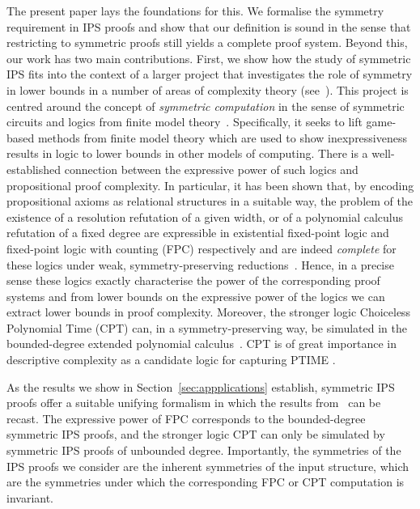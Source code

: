 \documentclass[a4paper,UKenglish,cleveref, autoref, thm-restate]{lipics-v2021}
\begin{document}
	The present paper lays the foundations for this. We formalise the symmetry requirement in IPS proofs and show that our definition is sound in the sense that restricting to symmetric proofs still yields a complete proof system. Beyond this, our work has two main contributions. First, we show how the study of symmetric IPS fits into the context of a larger project that investigates the role of symmetry in lower bounds in a number of areas of complexity theory (see~\cite{DawarCSL20}). This project is centred around the concept of \emph{symmetric computation} in the sense of symmetric circuits and logics from finite model theory~\cite{DawarICALP24,DawarPago24}. 
	Specifically, it seeks to lift game-based methods from finite model theory which are used to show inexpressiveness results in logic to lower bounds in other models of computing. 
	There is a well-established connection between the expressive power of such logics and propositional proof complexity. In particular, it has been shown that, by encoding propositional axioms as relational structures in a suitable way, the problem of the existence of a resolution refutation of a given width, or of a polynomial calculus refutation of a fixed degree are expressible in existential fixed-point logic and fixed-point logic with counting (FPC) respectively and are indeed \emph{complete} for these logics under weak, symmetry-preserving reductions~\cite{ggpp}.  Hence, in a precise sense these logics exactly characterise the power of the corresponding proof systems and from lower bounds on the expressive power of the logics we can extract lower bounds in proof complexity. Moreover, the stronger logic Choiceless Polynomial Time (CPT)  can, in a symmetry-preserving way, be simulated in the bounded-degree extended polynomial calculus~\cite{Pago}. CPT is of great importance in descriptive complexity as a candidate logic for capturing PTIME \cite{pakusa2015linear, gradel2015polynomial}.
	
	As the results we show in Section~\ref{sec:appplications} establish, symmetric IPS proofs offer a suitable unifying formalism in which the results from~\cite{ggpp, Pago} can be recast. The expressive power of FPC corresponds to the bounded-degree symmetric IPS proofs, and the stronger logic CPT can only be simulated by symmetric IPS proofs of unbounded degree.   Importantly, the symmetries of the IPS proofs we consider are the inherent symmetries of the input structure, which are the symmetries under which the corresponding FPC or CPT computation is invariant.
	
\end{document}
